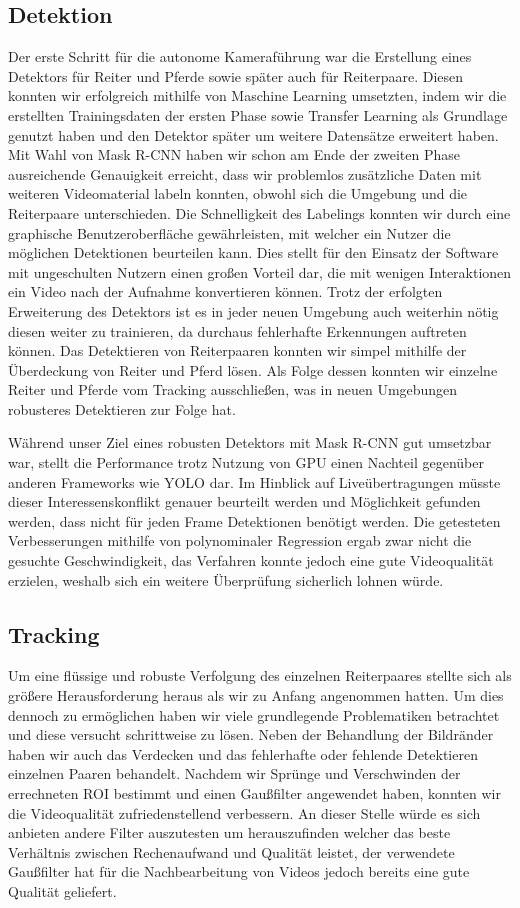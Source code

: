 \subsection*{ Detektion}
Der erste Schritt für die autonome Kameraführung war die Erstellung eines Detektors für Reiter und Pferde sowie später auch für Reiterpaare. Diesen konnten wir erfolgreich mithilfe von Maschine Learning umsetzten, indem wir die erstellten Trainingsdaten der ersten Phase sowie Transfer Learning als Grundlage genutzt haben und den Detektor später um weitere Datensätze erweitert haben. Mit Wahl von Mask R-CNN haben wir schon am Ende der zweiten Phase ausreichende Genauigkeit erreicht, dass wir problemlos zusätzliche Daten mit weiteren Videomaterial labeln konnten, obwohl sich die Umgebung und die Reiterpaare unterschieden. Die Schnelligkeit des Labelings konnten wir durch eine graphische Benutzeroberfläche gewährleisten, mit welcher ein Nutzer die möglichen Detektionen  beurteilen kann. Dies stellt für den Einsatz der Software mit ungeschulten Nutzern einen großen Vorteil dar, die mit wenigen Interaktionen ein Video nach der Aufnahme konvertieren können. Trotz der erfolgten Erweiterung des Detektors ist es in jeder neuen Umgebung auch weiterhin nötig diesen weiter zu trainieren, da durchaus fehlerhafte Erkennungen auftreten können.
Das Detektieren von Reiterpaaren konnten wir simpel mithilfe der Überdeckung von Reiter und Pferd lösen. Als Folge dessen konnten wir einzelne Reiter und Pferde vom Tracking ausschließen, was in neuen Umgebungen robusteres Detektieren zur Folge hat.

Während unser Ziel eines robusten Detektors mit Mask R-CNN gut umsetzbar war, stellt die Performance trotz Nutzung von GPU einen Nachteil gegenüber anderen Frameworks wie YOLO dar. Im Hinblick auf Liveübertragungen müsste dieser Interessenskonflikt genauer beurteilt werden und Möglichkeit gefunden werden, dass nicht für jeden Frame Detektionen benötigt werden. Die getesteten Verbesserungen mithilfe von polynominaler Regression ergab zwar nicht die gesuchte Geschwindigkeit, das Verfahren konnte jedoch eine gute Videoqualität erzielen, weshalb sich ein weitere Überprüfung sicherlich lohnen würde.


\subsection*{ Tracking}
Um eine flüssige und robuste Verfolgung des einzelnen Reiterpaares stellte sich als größere Herausforderung heraus als wir zu Anfang angenommen hatten. Um dies dennoch zu ermöglichen haben wir viele grundlegende Problematiken betrachtet und diese versucht schrittweise zu lösen. 
Neben der Behandlung der Bildränder haben wir auch das Verdecken und das fehlerhafte oder fehlende Detektieren einzelnen Paaren behandelt. Nachdem wir Sprünge und Verschwinden der errechneten ROI bestimmt und einen Gaußfilter angewendet haben, konnten wir die Videoqualität zufriedenstellend verbessern. An dieser Stelle würde es sich anbieten andere Filter auszutesten um herauszufinden welcher das beste Verhältnis zwischen Rechenaufwand und Qualität leistet, der verwendete Gaußfilter hat für die Nachbearbeitung von Videos jedoch bereits eine gute Qualität geliefert.

